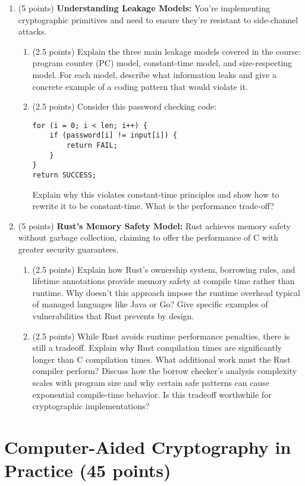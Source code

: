 \documentclass[10pt,a4paper,american]{article}
\begin{document}
\begin{enumerate}
	\item (5 points) \textbf{Understanding Leakage Models:}
	      You're implementing cryptographic primitives and need to ensure they're resistant to side-channel attacks.
	      \begin{enumerate}
		      \item (2.5 points) Explain the three main leakage models covered in the course: program counter (PC) model, constant-time model, and size-respecting model. For each model, describe what information leaks and give a concrete example of a coding pattern that would violate it.
		      \item (2.5 points) Consider this password checking code:
		            \begin{verbatim}
for (i = 0; i < len; i++) {
    if (password[i] != input[i]) {
        return FAIL;
    }
}
return SUCCESS;
\end{verbatim}
		            Explain why this violates constant-time principles and show how to rewrite it to be constant-time. What is the performance trade-off?
	      \end{enumerate}

	\item (5 points) \textbf{Rust's Memory Safety Model:}
	      Rust achieves memory safety without garbage collection, claiming to offer the performance of C with greater security guarantees.
	      \begin{enumerate}
		      \item (2.5 points) Explain how Rust's ownership system, borrowing rules, and lifetime annotations provide memory safety at compile time rather than runtime. Why doesn't this approach impose the runtime overhead typical of managed languages like Java or Go? Give specific examples of vulnerabilities that Rust prevents by design.
		      \item (2.5 points) While Rust avoids runtime performance penalties, there is still a tradeoff. Explain why Rust compilation times are significantly longer than C compilation times. What additional work must the Rust compiler perform? Discuss how the borrow checker's analysis complexity scales with program size and why certain safe patterns can cause exponential compile-time behavior. Is this tradeoff worthwhile for cryptographic implementations?
	      \end{enumerate}
\end{enumerate}

\section{Computer-Aided Cryptography in Practice (45 points)}
\end{document}
